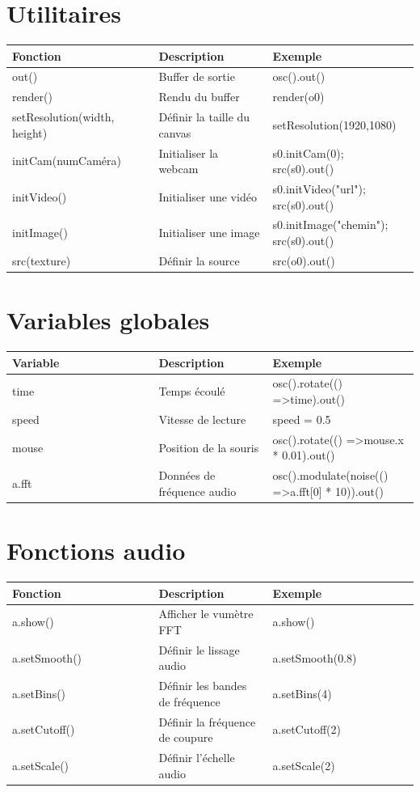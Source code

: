 \documentclass[9pt,oneside]{amsart}
\begin{document}
\section*{Utilitaires}
\begin{tabular}{L{0.36\linewidth}L{0.28\linewidth}L{0.40\linewidth}}
\toprule
\textbf{Fonction} & \textbf{Description} & \textbf{Exemple} \\
\midrule
out() & Buffer de sortie & osc().out() \\
render() & Rendu du buffer & render(o0) \\
setResolution(width, height) & Définir la taille du canvas & setResolution(1920,1080) \\
initCam(numCaméra) & Initialiser la webcam & s0.initCam(0); src(s0).out() \\
initVideo() & Initialiser une vidéo & s0.initVideo("url"); src(s0).out() \\
initImage() & Initialiser une image & s0.initImage("chemin"); src(s0).out() \\
src(texture) & Définir la source & src(o0).out() \\
\bottomrule
\end{tabular}

\section*{Variables globales}
\begin{tabular}{L{0.36\linewidth}L{0.28\linewidth}L{0.40\linewidth}}
\toprule
\textbf{Variable} & \textbf{Description} & \textbf{Exemple} \\
\midrule
time & Temps écoulé & osc().rotate(() =\textgreater  time).out() \\
speed & Vitesse de lecture & speed = 0.5 \\
mouse & Position de la souris & osc().rotate(() =\textgreater  mouse.x * 0.01).out() \\
a.fft & Données de fréquence audio & osc().modulate(noise(() =\textgreater  a.fft[0] * 10)).out() \\
\bottomrule
\end{tabular}

\section*{Fonctions audio}
\begin{tabular}{L{0.36\linewidth}L{0.28\linewidth}L{0.40\linewidth}}
\toprule
\textbf{Fonction} & \textbf{Description} & \textbf{Exemple} \\
\midrule
a.show() & Afficher le vumètre FFT & a.show() \\
a.setSmooth() & Définir le lissage audio & a.setSmooth(0.8) \\
a.setBins() & Définir les bandes de fréquence & a.setBins(4) \\
a.setCutoff() & Définir la fréquence de coupure & a.setCutoff(2) \\
a.setScale() & Définir l'échelle audio & a.setScale(2) \\
\bottomrule
\end{tabular}
\end{document}
